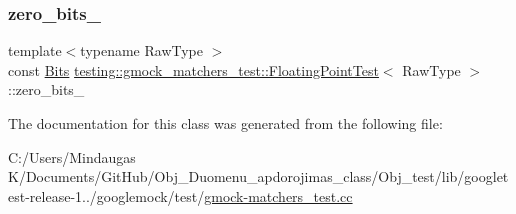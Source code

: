 \mbox{\label{classtesting_1_1gmock__matchers__test_1_1_floating_point_test_afb9b6beb1f152693155cf7db4e1fc4d2}} 
\subsubsection{\texorpdfstring{zero\_bits\_}{zero\_bits\_}}
{\footnotesize\ttfamily template$<$typename Raw\+Type $>$ \\
const \mbox{\hyperlink{classtesting_1_1gmock__matchers__test_1_1_floating_point_test_addf899bd832ae51103198d201d2f2ea2}{Bits}} \mbox{\hyperlink{classtesting_1_1gmock__matchers__test_1_1_floating_point_test}{testing\+::gmock\+\_\+matchers\+\_\+test\+::\+Floating\+Point\+Test}}$<$ Raw\+Type $>$\+::zero\+\_\+bits\+\_\+\hspace{0.3cm}{\ttfamily [protected]}}



The documentation for this class was generated from the following file\+:\begin{DoxyCompactItemize}
\item 
C\+:/\+Users/\+Mindaugas K/\+Documents/\+Git\+Hub/\+Obj\+\_\+\+Duomenu\+\_\+apdorojimas\+\_\+class/\+Obj\+\_\+test/lib/googletest-\/release-\/1../googlemock/test/\mbox{\hyperlink{_obj__test_2lib_2googletest-release-1_88_81_2googlemock_2test_2gmock-matchers__test_8cc}{gmock-\/matchers\+\_\+test.\+cc}}\end{DoxyCompactItemize}
